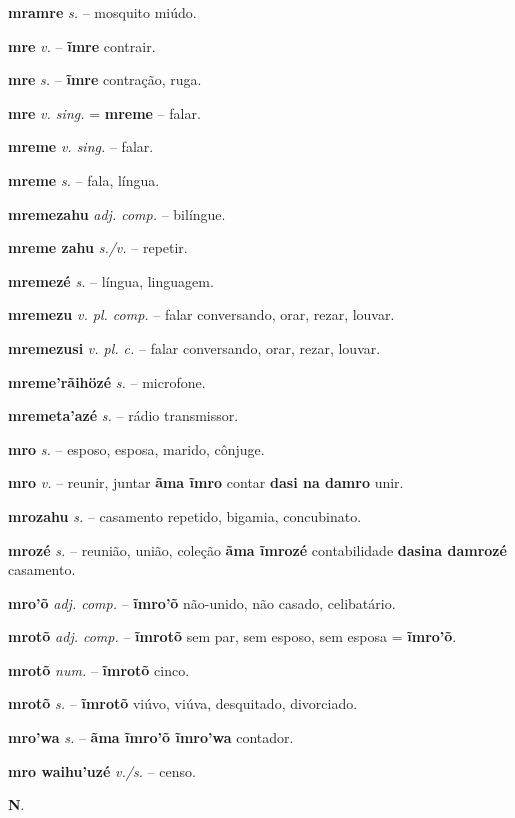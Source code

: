 \textbf{mramre} \textit{s.} -- mosquito miúdo.

\textbf{mre} \textit{v.} -- \textbf{ĩmre} contrair.

\textbf{mre} \textit{s.} -- \textbf{ĩmre} contração, ruga.

\textbf{mre} \textit{v. sing.} = \textbf{mreme} -- falar.

\textbf{mreme} \textit{v. sing.} -- falar.

\textbf{mreme} \textit{s.} -- fala, língua.

\textbf{mremezahu} \textit{adj. comp.} -- bilíngue.

\textbf{mreme zahu} \textit{s./v.} -- repetir.

\textbf{mremezé} \textit{s.} -- língua, linguagem.

\textbf{mremezu} \textit{v. pl. comp.} -- falar conversando, orar, rezar, louvar.

\textbf{mremezusi} \textit{v. pl. c.} -- falar conversando, orar, rezar, louvar.

\textbf{mreme'rãihözé} \textit{s.} -- microfone.

\textbf{mremeta'azé} \textit{s.} -- rádio transmissor.

\textbf{mro} \textit{s.} -- esposo, esposa, marido, cônjuge.

\textbf{mro} \textit{v.} -- reunir, juntar  \textbf{ãma ĩmro} contar  \textbf{dasi na damro} unir.

\textbf{mrozahu} \textit{s.} -- casamento repetido, bigamia, concubinato.

\textbf{mrozé} \textit{s.} -- reunião, união, coleção  \textbf{ãma ĩmrozé} contabilidade  \textbf{dasina damrozé} casamento.

\textbf{mro'õ} \textit{adj. comp.} -- \textbf{ĩmro'õ} não-unido, não casado, celibatário.

\textbf{mrotõ} \textit{adj. comp.} -- \textbf{ĩmrotõ} sem par, sem esposo, sem esposa = \textbf{ĩmro'õ}.

\textbf{mrotõ} \textit{num.} -- \textbf{ĩmrotõ} cinco.

\textbf{mrotõ} \textit{s.} -- \textbf{ĩmrotõ} viúvo, viúva, desquitado, divorciado.

\textbf{mro'wa} \textit{s.} -- \textbf{ãma ĩmro'õ ĩmro'wa} contador.

\textbf{mro waihu'uzé} \textit{v./s.} -- censo.



\textbf{N}.



